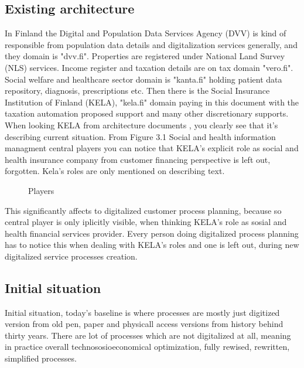 \subsection{Existing architecture}
\label{existing_architecture}

In Finland the Digital and Population Data Services Agency (DVV) is kind of
responsible from population data details and digitalization services
generally, and they domain is "dvv.fi". Properties are registered under
National Land Survey (NLS) services. Income register and taxation details are
on tax domain "vero.fi". Social welfare and healthcare sector domain is
"kanta.fi" holding patient data repository, diagnosis, prescriptions etc. Then
there is the Social Insurance Institution of Finland (KE\-LA), "kela.fi"
domain paying in this document with the taxation automation proposed support
and many other discretionary supports. When looking KE\-LA from architecture
documents \cite{SYPLJULK}, you clearly see that it's describing current
situation. From Figure 3.1 Social and health information managment central
players \cite{SYPLJULK_Kuva_3.1} you can notice that KE\-LA's explicit role as
social and health insurance company from customer financing perspective is
left out, forgotten. Kela's roles are only mentioned on describing text.

\begin{figure}
 \begin{center}
  \caption{Players}
  \label{fig:players} 
 \end{center}
\end{figure}

This significantly affects to digitalized customer process planning, because
so central player is only iplicitly visible, when thinking KE\-LA's role as
sosial and health financial services provider. Every person doing digitalized
process planning has to notice this when dealing with KE\-LA's roles and one
is left out, during new digitalized service processes creation.

\subsection{Initial situation}
\label{initial_situation}

Initial situation, today's baseline is where processes are mostly just
digitized version from old pen, paper and physicall access versions from
history behind thirty years. There are lot of processes which are not
digitalized at all, meaning in practice overall technososioeconomical
optimization, fully rewised, rewritten, simplified processes.

